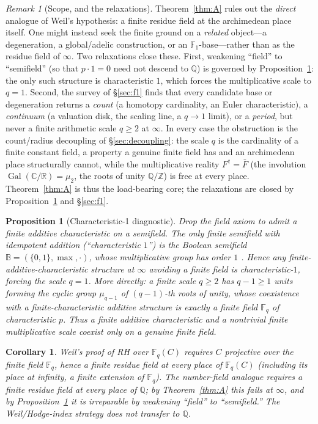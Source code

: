 \documentclass[11pt,reqno]{amsart}
\theoremstyle{plain}
\newtheorem{proposition}[theorem]{Proposition}
\newtheorem{corollary}[theorem]{Corollary}
\theoremstyle{definition}
\theoremstyle{remark}
\newtheorem{remark}[theorem]{Remark}
\newcommand{\Q}{\mathbb{Q}}
\newcommand{\R}{\mathbb{R}}
\newcommand{\C}{\mathbb{C}}
\newcommand{\Z}{\mathbb{Z}}
\newcommand{\F}{\mathbb{F}}
\newcommand{\Bool}{\mathbb{B}}
\newcommand{\dg}{^{\dagger}}
\newcommand{\Gal}{\operatorname{Gal}}
\begin{document}
\begin{remark}[Scope, and the relaxations]\label{rem:scope}
Theorem~\ref{thm:A} rules out the \emph{direct} analogue of Weil's hypothesis: a finite residue field at the
archimedean place itself. One might instead seek the finite ground on a \emph{related} object---a
degeneration, a global/adelic construction, or an $\F_1$-base---rather than as the residue field of $\infty$.
Two relaxations close these. First, weakening ``field'' to ``semifield'' (so that $p\cdot 1=0$ need not
descend to $\Q$) is governed by Proposition~\ref{prop:char1}: the only such structure is characteristic $1$,
which forces the multiplicative scale to $q=1$. Second, the survey of \S\ref{sec:f1} finds that every
candidate base or degeneration returns a \emph{count} (a homotopy cardinality, an Euler characteristic), a
\emph{continuum} (a valuation disk, the scaling line, a $q\to1$ limit), or a \emph{period}, but never a
finite arithmetic scale $q\geq2$ at $\infty$. In every case the obstruction is the count/radius decoupling of
\S\ref{sec:decoupling}: the scale $q$ is the cardinality of a finite constant field, a property a genuine
finite field has and an archimedean place structurally cannot, while the multiplicative reality $F\dg=\bar F$
(the involution $\Gal(\C/\R)=\mu_2$, the roots of unity $\Q/\Z$) is free at every place. Theorem~\ref{thm:A}
is thus the load-bearing core; the relaxations are closed by Proposition~\ref{prop:char1} and \S\ref{sec:f1}.
\end{remark}

\begin{proposition}[Characteristic-1 diagnostic]\label{prop:char1}
Drop the field axiom to admit a finite additive characteristic on a semifield. The only finite semifield with
idempotent addition (``characteristic $1$'') is the Boolean semifield $\Bool=(\{0,1\},\max,\cdot)$, whose
multiplicative group has order $1$ \cite{ConnesConsaniChar1,Lescot}. Hence any finite-additive-characteristic
structure at $\infty$ avoiding a finite field is characteristic-$1$, forcing the scale $q=1$. More directly: a
finite scale $q\geq2$ has $q-1\geq1$ units forming the cyclic group $\mu_{q-1}$ of $(q-1)$-th roots of unity,
whose coexistence with a finite-characteristic additive structure is exactly a finite field $\F_q$ of
characteristic $p$. Thus a finite additive characteristic and a nontrivial finite multiplicative scale coexist
only on a genuine finite field.
\end{proposition}

\begin{corollary}\label{cor:A}
Weil's proof of RH over $\F_q(C)$ requires $C$ projective over the finite field $\F_q$, hence a finite residue
field at every place of $\F_q(C)$ (including its place at infinity, a finite extension of $\F_q$). The
number-field analogue requires a finite residue field at every place of $\Q$; by Theorem~\ref{thm:A} this
fails at $\infty$, and by Proposition~\ref{prop:char1} it is irreparable by weakening ``field'' to
``semifield.'' The Weil/Hodge-index strategy does not transfer to $\Q$.
\end{corollary}
\end{document}
